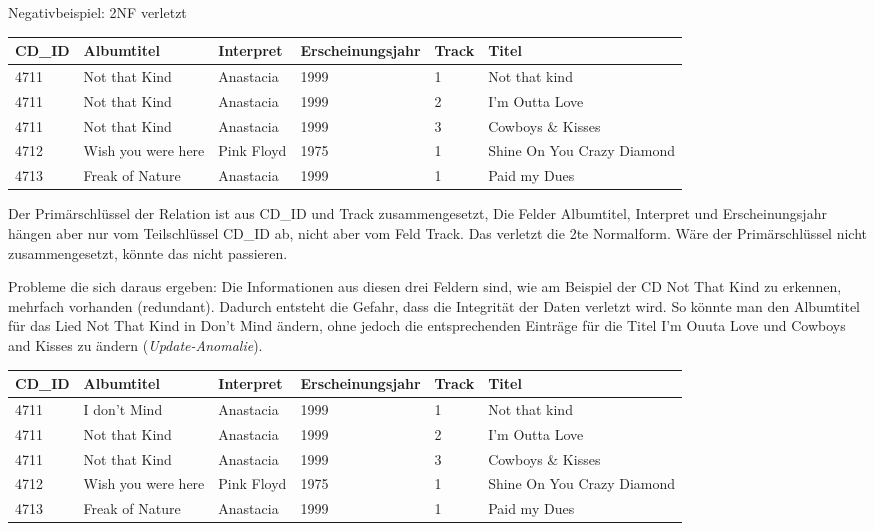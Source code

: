 \documentclass{scrbook}
\begin{document}
Negativbeispiel: 2NF verletzt

\begin{tabular}{l | l | l | l | l l |}
\hline
CD\_ID	& Albumtitel			& Interpret		& Erscheinungsjahr	& Track		& Titel \\
\hline
4711	& Not that Kind			& Anastacia		& 1999				& 1			& Not that kind \\
4711	& Not that Kind			& Anastacia		& 1999				& 2			& I'm Outta Love \\
4711	& Not that Kind			& Anastacia		& 1999				& 3			& Cowboys \& Kisses \\
4712	& Wish you were here	& Pink Floyd	& 1975				& 1			& Shine On You Crazy Diamond \\
4713	& Freak of Nature		& Anastacia		& 1999				& 1			& Paid my Dues \\
\hline
\end{tabular}

Der Primärschlüssel der Relation ist aus CD\_ID und Track zusammengesetzt,
Die Felder Albumtitel, Interpret und Erscheinungsjahr hängen aber nur vom Teilschlüssel CD\_ID ab,
nicht aber vom Feld Track. Das verletzt die 2te Normalform.
Wäre der Primärschlüssel nicht zusammengesetzt, könnte das nicht passieren.


Probleme die sich daraus ergeben:
Die Informationen aus diesen drei Feldern sind, wie am Beispiel der CD Not That Kind 
zu erkennen, mehrfach vorhanden (redundant).
Dadurch entsteht die Gefahr, dass die Integrität der Daten verletzt wird.
So könnte man den Albumtitel für das Lied Not That Kind in Don't Mind ändern,
ohne jedoch die entsprechenden Einträge für die Titel 
I'm Ouuta Love und Cowboys and Kisses zu ändern (\emph{Update-Anomalie}).

\begin{tabular}{| l | l | l | l | l | l |}
\hline
CD\_ID	& Albumtitel			& Interpret		& Erscheinungsjahr	& Track		& Titel \\
\hline
4711	& I don't Mind			& Anastacia		& 1999				& 1			& Not that kind \\
4711	& Not that Kind			& Anastacia		& 1999				& 2			& I'm Outta Love \\
4711	& Not that Kind			& Anastacia		& 1999				& 3			& Cowboys \& Kisses \\
4712	& Wish you were here	& Pink Floyd	& 1975				& 1			& Shine On You Crazy Diamond \\
4713	& Freak of Nature		& Anastacia		& 1999				& 1			& Paid my Dues \\
\hline
\end{tabular}
\end{document}
